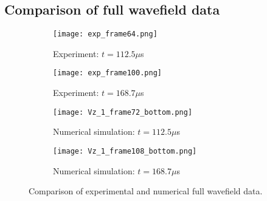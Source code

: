 \documentclass[preprint,12pt]{elsarticle}
\begin{document}
	\subsection{Comparison of full wavefield data }
	
	\begin{figure} [h!]
		\begin{subfigure}[b]{0.49\textwidth}
			\centering
			\texttt{[image: exp\_frame64.png]}
			\caption{Experiment: $t=112.5  \mu$s}
			\label{fig:exp_frame64}
		\end{subfigure}
		\begin{subfigure}[b]{0.49\textwidth}
			\centering
			\texttt{[image: exp\_frame100.png]}
			\caption{Experiment: $t=168.7 \mu$s}
			\label{fig:exp_frame100.png}
		\end{subfigure}
		\hfill
		\begin{subfigure}[b]{0.49\textwidth}
			\centering
			\texttt{[image: Vz\_1\_frame72\_bottom.png]} 
			\caption{Numerical simulation: $t=112.5  \mu$s}
			\label{fig:num_frame72}
		\end{subfigure}
	\centering
	\begin{subfigure}[b]{0.49\textwidth}
		\centering
		\texttt{[image: Vz\_1\_frame108\_bottom.png]}
		\caption{Numerical simulation: $t=168.7 \mu$s}
		\label{fig:num_frame108}
	\end{subfigure}
	\hfill
		\caption{Comparison of experimental and numerical full wavefield data.} 
		\label{fig:wavefields_comparison}
	\end{figure}
	\begin{comment}
	\begin{figure} [h!]
		\begin{subfigure}[b]{0.49\textwidth}
			\centering
			\texttt{[image: cut\_Vz\_1\_frame72\_top.png]} 
			\caption{Numerical simulation: $t=112.5  \mu$s}
			\label{fig:num_frame72top}
		\end{subfigure}
		\centering
		\begin{subfigure}[b]{0.49\textwidth}
			\centering
			\texttt{[image: cut\_Vz\_1\_frame108\_top.png]}
			\caption{Numerical simulation: $t=168.7 \mu$s}
			\label{fig:num_frame108top}
		\end{subfigure}
		\hfill
		\caption{Numerical full wavefield data at top surface of the plate.} 
		\label{fig:num_wavefield_top}
	\end{figure}
\end{comment}
\clearpage
\end{document}
